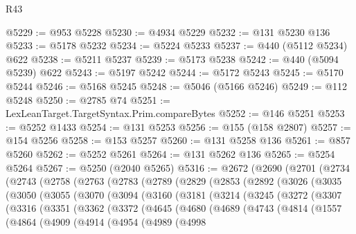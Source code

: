 \begin{lexlean}{R43}
\begin{coremodule}
@5229 := @953 @5228
@5230 := @4934 @5229
@5232 := @131 @5230 @136
@5233 := @5178 @5232
@5234 := @5224 @5233
@5237 := @440 (@5112 @5234) @622
@5238 := @5211 @5237
@5239 := @5173 @5238
@5242 := @440 (@5094 @5239) @622
@5243 := @5197 @5242
@5244 := @5172 @5243
@5245 := @5170 @5244
@5246 := @5168 @5245
@5248 := @5046 (@5166 @5246)
@5249 := @112 @5248
@5250 := @2785 @74
@5251 := LexLeanTarget.TargetSyntax.Prim.compareBytes
@5252 := @146 @5251
@5253 := @5252 @1433
@5254 := @131 @5253
@5256 := @155 (@158 @2807)
@5257 := @154 @5256
@5258 := @153 @5257
@5260 := @131 @5258 @136
@5261 := @857 @5260
@5262 := @5252 @5261
@5264 := @131 @5262 @136
@5265 := @5254 @5264
@5267 := @5250 (@2040 @5265)
@5316 := @2672
    (@2690
      (@2701
        (@2734
          (@2743
            (@2758
              (@2763
                (@2783
                  (@2789
                    (@2829
                      (@2853
                        (@2892
                          (@3026
                            (@3035
                              (@3050
                                (@3055
                                  (@3070
                                    (@3094
                                      (@3160
                                        (@3181
                                          (@3214
                                            (@3245
                                              (@3272
                                                (@3307
                                                  (@3316
                                                    (@3351
                                                      (@3362
                                                        (@3372
                                                          (@4645
                                                            (@4680
                                                              (@4689
                                                                (@4743
                                                                  (@4814
                                                                    (@1557
                                                                      (@4864
                                                                        (@4909
                                                                          (@4914
                                                                            (@4954
                                                                              (@4989
                                                                                (@4998

\end{coremodule}
\end{lexlean}
